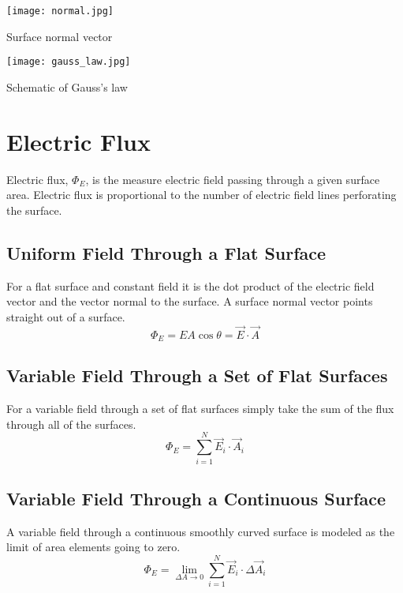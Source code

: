 \newpage

\begin{marginfigure}[50pt]%
  \texttt{[image: normal.jpg]}
  \caption{Surface normal vector}
  \label{fig:marginfig}
\end{marginfigure}

\begin{marginfigure}[0pt]%
  \texttt{[image: gauss\_law.jpg]}
  \caption{Schematic of Gauss's law }
  \label{fig:marginfig}
\end{marginfigure}

  \section{Electric Flux}
  Electric flux, $\Phi_E$, is the measure electric field passing through a given surface area. Electric flux is proportional to the number of electric field lines perforating the surface.  
  \subsection{Uniform Field Through a Flat Surface}
  For a flat surface and constant field it is the dot product of the electric field vector and the vector normal to the surface.  A surface normal vector points straight out of a surface.
  $$\Phi_E=EA\cos\theta=\overrightarrow{E}\cdot \overrightarrow{A}$$  
  \subsection{Variable Field Through a Set of Flat Surfaces}
  For a variable field through a set of flat surfaces simply take the sum of the flux through all of the surfaces.
  $$\Phi_E=\sum_{i=1}^{N} \overrightarrow{E}_i\cdot \overrightarrow{A}_i$$
   \subsection{Variable Field Through a Continuous Surface}
   A variable field through a continuous smoothly curved surface is modeled as the limit of area elements going to zero. 
   $$\Phi_E=\lim_{\Delta A \rightarrow 0 }\sum_{i=1}^{N} \overrightarrow{E}_i\cdot \Delta \overrightarrow{A}_i$$
   


